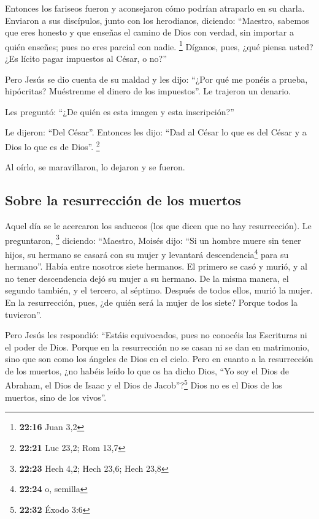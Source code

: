  Entonces los fariseos fueron y aconsejaron cómo podrían
atraparlo en su charla.  Enviaron a sus discípulos, junto
con los herodianos, diciendo: ``Maestro, sabemos que eres honesto y que
enseñas el camino de Dios con verdad, sin importar a quién enseñes; pues
no eres parcial con nadie. \footnote{\textbf{22:16} Juan 3,2}
 Díganos, pues, ¿qué piensa usted? ¿Es lícito pagar
impuestos al César, o no?''

 Pero Jesús se dio cuenta de su maldad y les dijo: ``¿Por
qué me ponéis a prueba, hipócritas?  Muéstrenme el dinero
de los impuestos''. Le trajeron un denario.

 Les preguntó: ``¿De quién es esta imagen y esta
inscripción?''

 Le dijeron: ``Del César''. Entonces les dijo: ``Dad al
César lo que es del César y a Dios lo que es de Dios''. \footnote{\textbf{22:21}
  Luc 23,2; Rom 13,7}

 Al oírlo, se maravillaron, lo dejaron y se fueron.

\hypertarget{sobre-la-resurrecciuxf3n-de-los-muertos}{%
\subsection{Sobre la resurrección de los
muertos}\label{sobre-la-resurrecciuxf3n-de-los-muertos}}

 Aquel día se le acercaron los saduceos (los que dicen
que no hay resurrección). Le preguntaron, \footnote{\textbf{22:23} Hech
  4,2; Hech 23,6; Hech 23,8}  diciendo: ``Maestro, Moisés
dijo: ``Si un hombre muere sin tener hijos, su hermano se casará con su
mujer y levantará descendencia\footnote{\textbf{22:24} o, semilla} para
su hermano''.  Había entre nosotros siete hermanos. El
primero se casó y murió, y al no tener descendencia dejó su mujer a su
hermano.  De la misma manera, el segundo también, y el
tercero, al séptimo.  Después de todos ellos, murió la
mujer.  En la resurrección, pues, ¿de quién será la mujer
de los siete? Porque todos la tuvieron''.

 Pero Jesús les respondió: ``Estáis equivocados, pues no
conocéis las Escrituras ni el poder de Dios.  Porque en
la resurrección no se casan ni se dan en matrimonio, sino que son como
los ángeles de Dios en el cielo.  Pero en cuanto a la
resurrección de los muertos, ¿no habéis leído lo que os ha dicho Dios,
 ``Yo soy el Dios de Abraham, el Dios de Isaac y el Dios
de Jacob''?\footnote{\textbf{22:32} Éxodo 3:6} Dios no es el Dios de los
muertos, sino de los vivos''.

